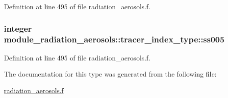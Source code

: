 Definition at line 495 of file radiation\+\_\+aerosols.\+f.

\subsubsection[{\texorpdfstring{ss005}{ss005}}]{\setlength{\rightskip}{0pt plus 5cm}integer module\+\_\+radiation\+\_\+aerosols\+::tracer\+\_\+index\+\_\+type\+::ss005\hspace{0.3cm}{\ttfamily [private]}}\hypertarget{structmodule__radiation__aerosols_1_1tracer__index__type_a3c67144cb8aeedfb6c51c474a5072605}{}\label{structmodule__radiation__aerosols_1_1tracer__index__type_a3c67144cb8aeedfb6c51c474a5072605}


Definition at line 495 of file radiation\+\_\+aerosols.\+f.



The documentation for this type was generated from the following file\+:\begin{DoxyCompactItemize}
\item 
\hyperlink{radiation__aerosols_8f}{radiation\+\_\+aerosols.\+f}\end{DoxyCompactItemize}
